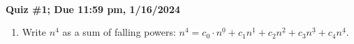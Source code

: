 \documentclass[10pt, AMS Euler]{article}
\begin{document}
	\\
    \\
	\noindent \underline{\hspace{2in}}\\
 
	{\bf Quiz \#1; Due 11:59 pm, 1/16/2024}\\
 
        \newpage
    	\begin{enumerate}
        \item Write $n^4$ as a sum of falling powers: $n^4 = c_0\cdot n^{\underline{0}} + c_1 n^{\underline{1}}+c_2 n^{\underline{2}} +c_3 n^{\underline{3}} +c_4 n^{\underline{4}}$.
        \end{enumerate}
            
\end{document}
